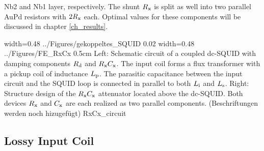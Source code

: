 Nb2 and Nb1 layer, respectively. The shunt $R_{\rm x}$ is split as well into two parallel AuPd resistors with $2R_{\rm x}$ each. Optimal values for these components will be discussed in chapter \ref{ch_results}.

{width=0.48\textwidth}
{../Figures/gekoppeltes_SQUID}
{0.02\textwidth} %
{width=0.48\textwidth}
{../Figures/FE_RxCx}
{0.5cm} %
{Left: Schematic circuit of a coupled dc-SQUID with damping components $R_{\rm d}$ and $R_{\rm x}C_{\rm x}$. The input coil forms a flux transformer with a pickup coil of inductance $L_{\rm p}$. The parasitic capacitance between the input circuit and the SQUID loop is connected in parallel to both $L_{\rm i}$ and $L_{\rm s}$. Right: Structure design of the $R_{\rm x}C_{\rm x}$ attenuator located above the dc-SQUID. Both devices $R_{\rm x}$ and $C_{\rm x}$ are each realized as two parallel components. (Beschriftungen werden noch hizugefügt)}
{RxCx_circuit}

\subsection{Lossy Input Coil}\label{subsec_L_FE}

